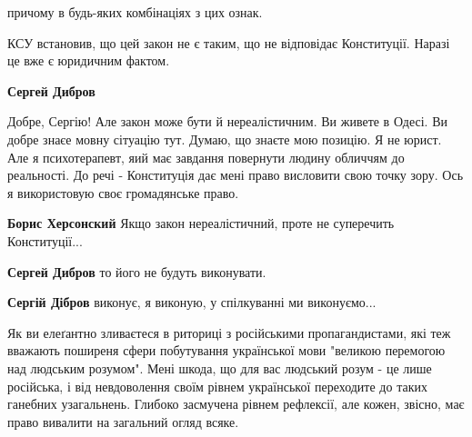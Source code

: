 \begin{itemize}
причому в будь-яких комбінаціях з цих ознак.

КСУ встановив, що цей закон не є таким, що не відповідає Конституції. Наразі це
вже є юридичним фактом.

\begin{itemize}
 
\textbf{Сергей Дибров} 

Добре, Сергію! Але закон може бути й нереалістичним. Ви живете в Одесі. Ви
добре знаєе мовну сітуацію тут. Думаю, що знаєте мою позицію. Я не юрист. Але я
психотерапевт, яий має завдання повернути людину обличчям до реальності. До
речі - Конституція дає мені право висловити свою точку зору. Ось я використовую
своє громадянське право.

 

\textbf{Борис Херсонский}
Якщо закон нереалістичний, проте не суперечить Конституції...

 
\textbf{Сергей Дибров} то його не будуть виконувати.

 
\textbf{Сергій Дібров} виконує, я виконую, у спілкуванні ми виконуємо...
\end{itemize}

 

Як ви елеґантно зливаєтеся в риториці з російськими пропагандистами, які теж
вважають поширеня сфери побутування української мови "великою перемогою над
людським розумом". Мені шкода, що для вас людський розум - це лише російська, і
від невдоволення своїм рівнем української переходите до таких ганебних
узагальнень. Глибоко засмучена рівнем рефлексії, але кожен, звісно, має право
вивалити на загальний огляд всяке.


\end{itemize}
